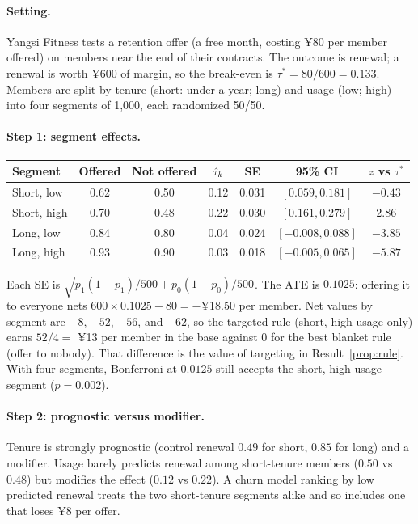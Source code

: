 \documentclass[11pt]{article}
\begin{document}
\sectiontwo

\paragraph{Setting.} Yangsi Fitness tests a retention offer (a free month, costing ¥80 per member offered) on members
near the end of their contracts. The outcome is renewal; a renewal is worth ¥600 of margin, so the break-even is
$\tau^\ast = 80/600 = 0.133$. Members are split by tenure (short: under a year; long) and usage (low; high) into
four segments of 1{,}000, each randomized 50/50.

\paragraph{Step 1: segment effects.}
\begin{center}
\begin{tabular}{lcccccc}
\toprule
Segment & Offered & Not offered & $\hat{\tau}_k$ & SE & 95\% CI & $z$ vs $\tau^\ast$ \\
\midrule
Short, low  & 0.62 & 0.50 & 0.12 & 0.031 & $[0.059, 0.181]$ & $-0.43$ \\
Short, high & 0.70 & 0.48 & 0.22 & 0.030 & $[0.161, 0.279]$ & $2.86$ \\
Long, low   & 0.84 & 0.80 & 0.04 & 0.024 & $[-0.008, 0.088]$ & $-3.85$ \\
Long, high  & 0.93 & 0.90 & 0.03 & 0.018 & $[-0.005, 0.065]$ & $-5.87$ \\
\bottomrule
\end{tabular}
\end{center}
Each SE is $\sqrt{p_1(1-p_1)/500 + p_0(1-p_0)/500}$. The ATE is $0.1025$: offering it to everyone nets
$600 \times 0.1025 - 80 = -$¥18.50 per member. Net values by segment are $-8$, $+52$, $-56$, and $-62$, so the
targeted rule (short, high usage only) earns $52/4 = $ ¥13 per member in the base against $0$ for the best
blanket rule (offer to nobody). That difference is the value of targeting in Result~\ref{prop:rule}. With four segments, Bonferroni
at $0.0125$ still accepts the short, high-usage segment ($p = 0.002$).

\paragraph{Step 2: prognostic versus modifier.} Tenure is strongly prognostic (control renewal $0.49$ for short,
$0.85$ for long) and a modifier. Usage barely predicts renewal among short-tenure members ($0.50$ vs $0.48$) but
modifies the effect ($0.12$ vs $0.22$). A churn model ranking by low predicted renewal treats the two short-tenure
segments alike and so includes one that loses ¥8 per offer.
\end{document}
